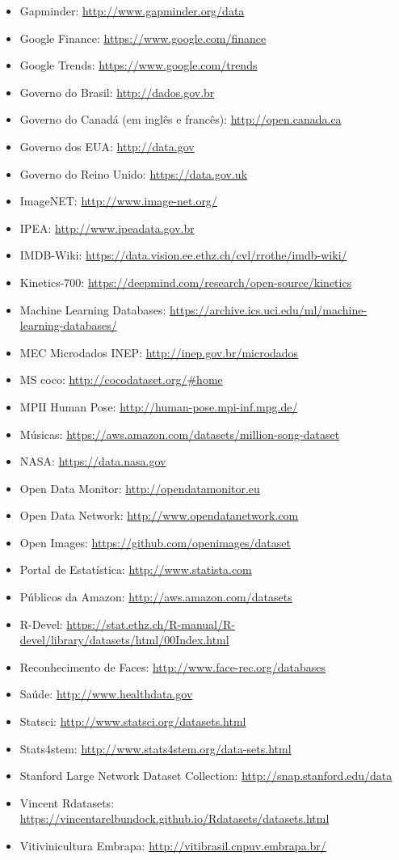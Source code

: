 \documentclass[a4paper,11pt]{book} %
\begin{document}
\begin{itemize}[noitemsep]
	\item Gapminder: \url{http://www.gapminder.org/data}
	\item Google Finance: \url{https://www.google.com/finance}
	\item Google Trends: \url{https://www.google.com/trends}
	\item Governo do Brasil: \url{http://dados.gov.br}
	\item Governo do Canadá (em inglês e francês): \url{http://open.canada.ca}
	\item Governo dos EUA: \url{http://data.gov}
	\item Governo do Reino Unido: \url{https://data.gov.uk}
	\item ImageNET: \url{http://www.image-net.org/}
	\item IPEA: \url{http://www.ipeadata.gov.br}
	\item IMDB-Wiki: \url{https://data.vision.ee.ethz.ch/cvl/rrothe/imdb-wiki/}
	\item Kinetics-700: \url{https://deepmind.com/research/open-source/kinetics}
	\item Machine Learning Databases: \url{https://archive.ics.uci.edu/ml/machine-learning-databases/}
	\item MEC Microdados INEP: \url{http://inep.gov.br/microdados}
	\item MS coco: \url{http://cocodataset.org/#home}
	\item MPII Human Pose: \url{http://human-pose.mpi-inf.mpg.de/}
	\item Músicas: \url{https://aws.amazon.com/datasets/million-song-dataset}
	\item NASA: \url{https://data.nasa.gov}
	\item Open Data Monitor: \url{http://opendatamonitor.eu}
	\item Open Data Network: \url{http://www.opendatanetwork.com}
	\item Open Images: \url{https://github.com/openimages/dataset}
	\item Portal de Estatística: \url{http://www.statista.com}
	\item Públicos da Amazon: \url{http://aws.amazon.com/datasets}
	\item R-Devel: \url{https://stat.ethz.ch/R-manual/R-devel/library/datasets/html/00Index.html}
	\item Reconhecimento de Faces: \url{http://www.face-rec.org/databases}
	\item Saúde: \url{http://www.healthdata.gov}
	\item Statsci: \url{http://www.statsci.org/datasets.html}
	\item Stats4stem: \url{http://www.stats4stem.org/data-sets.html}
	\item Stanford Large Network Dataset Collection: \url{http://snap.stanford.edu/data}
	\item Vincent Rdatasets: \url{https://vincentarelbundock.github.io/Rdatasets/datasets.html}
	\item Vitivinicultura Embrapa: \url{http://vitibrasil.cnpuv.embrapa.br/}
\end{itemize}
\end{document}
